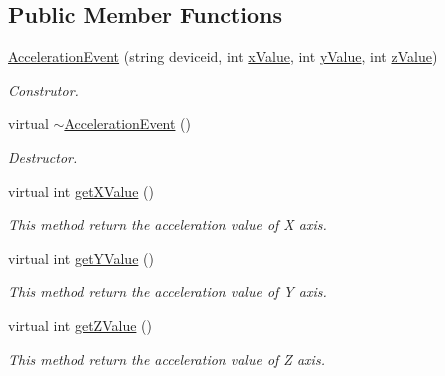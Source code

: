 \subsection*{Public Member Functions}
\begin{DoxyCompactItemize}
\item 
\hyperlink{classbr_1_1ufscar_1_1lince_1_1mmi_1_1AccelerationEvent_a0b697e055fc5bb1c3947435f0c25bd5d}{AccelerationEvent} (string deviceid, int \hyperlink{classbr_1_1ufscar_1_1lince_1_1mmi_1_1AccelerationEvent_aa8aa3708d87ebf38147a09b4d83eb604}{xValue}, int \hyperlink{classbr_1_1ufscar_1_1lince_1_1mmi_1_1AccelerationEvent_a1b87b4708c1f8ce65293b7fc3a148183}{yValue}, int \hyperlink{classbr_1_1ufscar_1_1lince_1_1mmi_1_1AccelerationEvent_a2fea6058c45c23e43ce8eb6f829a4990}{zValue})
\begin{DoxyCompactList}\small\item\em Construtor. \item\end{DoxyCompactList}\item 
virtual \hyperlink{classbr_1_1ufscar_1_1lince_1_1mmi_1_1AccelerationEvent_ab80cc047d3044e1450fb74bb1e62f8ab}{$\sim$AccelerationEvent} ()
\begin{DoxyCompactList}\small\item\em Destructor. \item\end{DoxyCompactList}\item 
virtual int \hyperlink{classbr_1_1ufscar_1_1lince_1_1mmi_1_1AccelerationEvent_a3e4798af9e022dbf7cdef27976437956}{getXValue} ()
\begin{DoxyCompactList}\small\item\em This method return the acceleration value of X axis. \item\end{DoxyCompactList}\item 
virtual int \hyperlink{classbr_1_1ufscar_1_1lince_1_1mmi_1_1AccelerationEvent_aa647428aca2ae84a2b9a58d5dd51ebb0}{getYValue} ()
\begin{DoxyCompactList}\small\item\em This method return the acceleration value of Y axis. \item\end{DoxyCompactList}\item 
virtual int \hyperlink{classbr_1_1ufscar_1_1lince_1_1mmi_1_1AccelerationEvent_a311a142a28339e32a09ba84971617351}{getZValue} ()
\begin{DoxyCompactList}\small\item\em This method return the acceleration value of Z axis. \item\end{DoxyCompactList}\end{DoxyCompactItemize}
